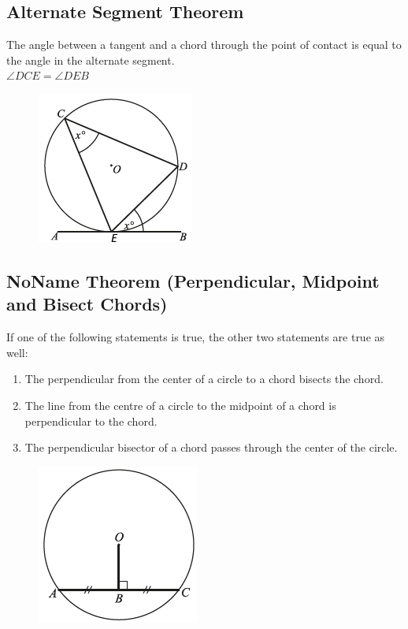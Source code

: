 \documentclass[12pt]{article}
\begin{document}
	\subsection{Alternate Segment Theorem}
	The angle between a tangent and a chord through the point of contact is equal to the angle in the alternate segment.\\
	$\angle DCE = \angle DEB$
	\begin{figure}[h!]
		\centering
		\includegraphics[height=0.2\textheight]{Graphics/Week_13/AlternateSegment.png}
	\end{figure}

	\subsection{NoName Theorem (Perpendicular, Midpoint and Bisect Chords)}
	If one of the following statements is true, the other two statements are true as well:
	\begin{enumerate}
		\item The perpendicular from the center of a circle to a chord bisects the chord.
		\item The line from the centre of a circle to the midpoint of a chord is perpendicular to the chord.
		\item The perpendicular bisector of a chord passes through the center of the circle.
	\end{enumerate}
	\begin{figure}[h!]
		\centering
		\includegraphics[height=0.2\textheight]{Graphics/Week_13/MidBisectChord.png}
	\end{figure}
\end{document}
